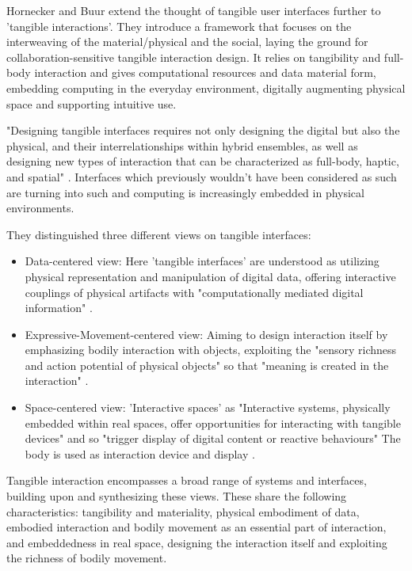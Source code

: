 Hornecker and Buur \cite{hornecker06} extend the thought of tangible user interfaces further to 'tangible interactions'. They introduce a framework that focuses on the interweaving of the material/physical and the social, laying the ground for collaboration-sensitive tangible interaction design. It relies on tangibility and full-body interaction and gives computational resources and data material form, embedding computing in the everyday environment, digitally augmenting physical space and supporting intuitive use. 

"Designing tangible interfaces requires not only designing the digital but also the physical, and their interrelationships within hybrid ensembles, as well as designing new types of interaction that can be characterized as full-body, haptic, and spatial" \cite{hornecker06}.
Interfaces which previously wouldn't have been considered as such are turning into such and computing is increasingly embedded in physical environments.

They distinguished three different views on tangible interfaces:
\begin{itemize}
\item Data-centered view: Here 'tangible interfaces' are understood as utilizing physical representation and manipulation of digital data, offering interactive couplings of physical artifacts with "computationally mediated digital information" \cite{Holmquist04}.
\item Expressive-Movement-centered view: Aiming to design interaction itself by emphasizing bodily interaction with objects, exploiting the "sensory richness and action potential of physical objects" so that "meaning is created in the interaction" \cite{Djajadiningrat02}.
\item Space-centered view: 'Interactive spaces' as "Interactive systems, physically embedded within real spaces, offer opportunities for interacting with tangible devices" and so "trigger display of digital content or reactive behaviours" The body is used as interaction device and display \cite{Ciolfi04}.
\end{itemize}

Tangible interaction encompasses a broad range of systems and interfaces, building upon and synthesizing these views. These share the following characteristics: tangibility and materiality, physical embodiment of data, embodied interaction and bodily movement as an essential part of interaction, and embeddedness in real space, designing the interaction itself and exploiting the richness of bodily movement.

